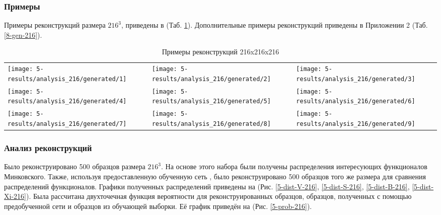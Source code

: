 		\subsubsection{Примеры}
			Примеры реконструкций размера $216^3$, приведены в (Таб. \ref{5-gen-216}). Дополнительные примеры реконструкций приведены в Приложении 2 (Таб. \ref{8-gen-216}).
		
			\begin{table}[h]
				\centering
				\begin{tabular}{p{5cm} p{5cm} p{5cm}}
					\toprule
					\texttt{[image: 5-results/analysis\_216/generated/1]}
					&
					\texttt{[image: 5-results/analysis\_216/generated/2]}
					&
					\texttt{[image: 5-results/analysis\_216/generated/3]}
					\\
					\texttt{[image: 5-results/analysis\_216/generated/4]}
					&
					\texttt{[image: 5-results/analysis\_216/generated/5]}
					&
					\texttt{[image: 5-results/analysis\_216/generated/6]}
					\\
					\texttt{[image: 5-results/analysis\_216/generated/7]}
					&
					\texttt{[image: 5-results/analysis\_216/generated/8]}
					&
					\texttt{[image: 5-results/analysis\_216/generated/9]}
					\\
					\bottomrule
				\end{tabular}
				\caption{Примеры реконструкций 216x216x216}
				\label{5-gen-216}
			\end{table} 
		
		\subsubsection{Анализ реконструкций}
			Было реконструировано 500 образцов размера $216^3$. На основе этого набора были получены распределения интересующих функционалов Минковского. Также, используя предоставленную обученную сеть \cite{Mosser}, было реконструировано 500 образцов того же размера для сравнения распределений функционалов. Графики полученных распределений приведены на (Рис. \ref{5-dist-V-216}, \ref{5-dist-S-216}, \ref{5-dist-B-216}, \ref{5-dist-Xi-216}). Была рассчитана двухточечная функция вероятности для реконструированных образцов, образцов, полученных с помощью предобученной сети \cite{Mosser} и образцов из обучающей выборки. Её график приведён на (Рис. \ref{5-prob-216}).
		
